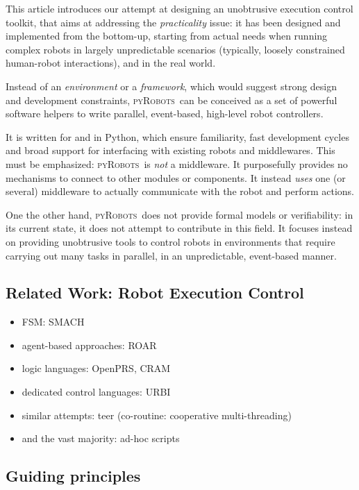 \documentclass[a4paper, 10pt, conference]{ieeeconf}      %
\newcommand{\pyRobots}{\textsc{pyRobots}\ }
\begin{document}
This article introduces our attempt at designing an unobtrusive execution control
toolkit, that aims at addressing the \emph{practicality} issue: it has been
designed and implemented from the bottom-up, starting from actual needs when
running complex robots in largely unpredictable scenarios (typically,
loosely constrained human-robot interactions), and in the real world.

Instead of an \emph{environment} or a \emph{framework}, which would suggest
strong design and development constraints, \pyRobots can be conceived as a set of
powerful software helpers to write parallel, event-based, high-level robot
controllers.

It is written for and in Python, which ensure familiarity, fast development
cycles and broad support for interfacing with existing robots and middlewares.
This must be emphasized: \pyRobots is \emph{not} a middleware. It purposefully
provides no mechanisms to connect to other modules or components. It instead
\emph{uses} one (or several) middleware to actually communicate with the robot
and perform actions.

One the other hand, \pyRobots does not provide formal models or verifiability:
in its current state, it does not attempt to contribute in this field. It
focuses instead on providing unobtrusive tools to control robots in environments
that require carrying out many tasks in parallel, in an unpredictable,
event-based manner.

\subsection{Related Work: Robot Execution Control}

\begin{itemize}
    \item FSM: SMACH
    \item agent-based approaches: ROAR
    \item logic languages: OpenPRS, CRAM
    \item dedicated control languages: URBI
    \item similar attempts: teer (co-routine: cooperative multi-threading)
    \item and the vast majority: ad-hoc scripts
\end{itemize}

\subsection{Guiding principles}
\end{document}
